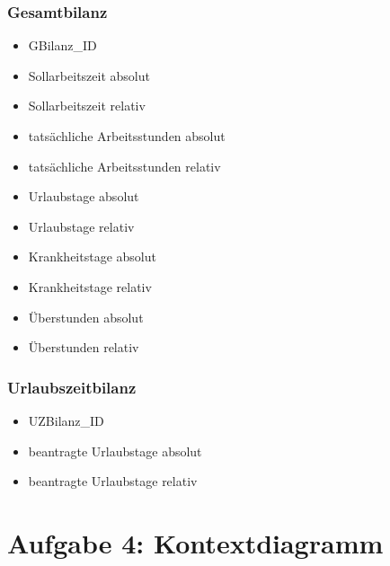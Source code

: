 \subsection{Gesamtbilanz}
\begin{itemize}[label=+]
\item[] GBilanz\_ID
\item Sollarbeitszeit absolut
\item Sollarbeitszeit relativ
\item tatsächliche Arbeitsstunden absolut
\item tatsächliche Arbeitsstunden relativ
\item Urlaubstage absolut
\item Urlaubstage relativ
\item Krankheitstage absolut
\item Krankheitstage relativ
\item Überstunden absolut
\item Überstunden relativ
\end{itemize}

\subsection{Urlaubszeitbilanz}
\begin{itemize}[label=+]
\item[] UZBilanz\_ID
\item beantragte Urlaubstage absolut
\item beantragte Urlaubstage relativ
\end{itemize}

\chapter*{Aufgabe 4: Kontextdiagramm}
\setcounter{section}{0}
\addtocounter{chapter}{1}


